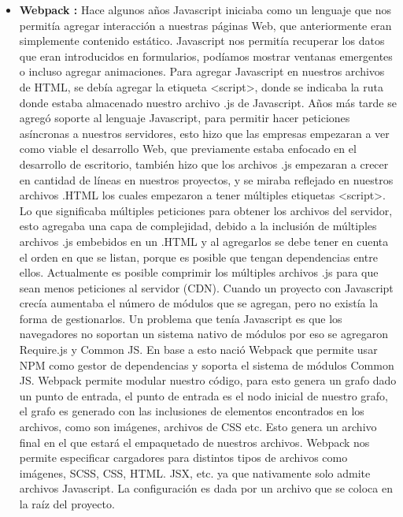 \begin{itemize}
       \item \textbf{ Webpack :} Hace algunos años Javascript iniciaba como un lenguaje que nos permitía agregar interacción a nuestras páginas Web, que anteriormente eran simplemente contenido estático.  Javascript nos permitía recuperar los datos que eran introducidos en formularios, podíamos mostrar ventanas emergentes o incluso agregar animaciones. Para agregar Javascript en nuestros archivos de HTML, se debía agregar la etiqueta <script>, donde se indicaba la ruta donde estaba almacenado nuestro archivo .js de Javascript.  
    Años más tarde se agregó soporte al lenguaje Javascript, para permitir hacer peticiones asíncronas a nuestros servidores, esto hizo que las empresas empezaran a ver como viable el desarrollo Web, que previamente estaba enfocado en el desarrollo de escritorio, también hizo que los archivos .js empezaran a crecer en cantidad de líneas en nuestros proyectos, y se miraba reflejado en nuestros archivos .HTML los cuales empezaron a tener múltiples etiquetas <script>. Lo que significaba múltiples peticiones para obtener los archivos del servidor, esto agregaba una capa de complejidad, debido a la inclusión de múltiples archivos .js embebidos en un .HTML y al agregarlos se debe tener en cuenta el orden en que se listan, porque es posible que tengan dependencias entre ellos. Actualmente es posible comprimir los múltiples archivos .js para que sean menos peticiones al servidor (CDN).  Cuando un proyecto con Javascript crecía aumentaba el número de módulos que se agregan, pero no existía la forma de gestionarlos. Un problema que tenía Javascript es que los navegadores no soportan un sistema nativo de módulos por eso se agregaron Require.js y Common JS. 
    En base a esto nació Webpack \cite{webPack} que permite usar NPM como gestor de dependencias y soporta el sistema de módulos Common JS.
    Webpack permite modular nuestro código, para esto genera un grafo dado un punto de entrada, el punto de entrada es el nodo inicial de nuestro grafo, el grafo es generado con las inclusiones de elementos encontrados en los archivos, como son imágenes, archivos de CSS etc. Esto genera un archivo final en el que estará el empaquetado de nuestros archivos. 
    Webpack nos permite especificar cargadores para distintos tipos de archivos como imágenes, SCSS, CSS, HTML. JSX, etc. ya que nativamente solo admite archivos Javascript. 
    La configuración es dada por un archivo que se coloca en la raíz del proyecto.
    

\end{itemize}
